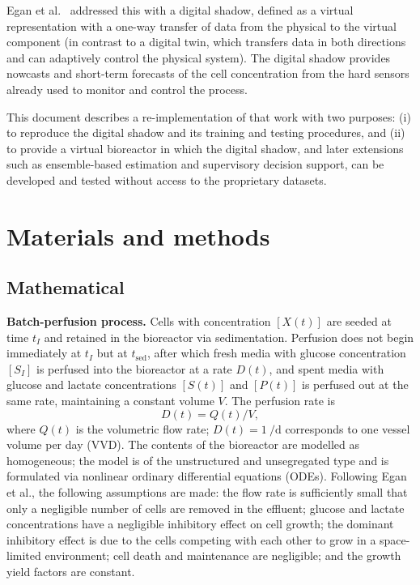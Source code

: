 \documentclass[11pt,a4paper]{article}
\newcommand{\tsed}{t_{\mathrm{sed}}}
\newcommand{\cS}{[S(t)]}
\newcommand{\cP}{[P(t)]}
\newcommand{\cX}{[X(t)]}
\begin{document}
Egan et al.\ \cite{egan2025} addressed this with a digital shadow, defined as a virtual
representation with a one-way transfer of data from the physical to the virtual component (in
contrast to a digital twin, which transfers data in both directions and can adaptively control the
physical system). The digital shadow provides nowcasts and short-term forecasts of the cell
concentration from the hard sensors already used to monitor and control the process.

This document describes a re-implementation of that work with two purposes: (i) to reproduce the
digital shadow and its training and testing procedures, and (ii) to provide a virtual bioreactor in
which the digital shadow, and later extensions such as ensemble-based estimation and supervisory
decision support, can be developed and tested without access to the proprietary datasets.

\section{Materials and methods}

\subsection{Mathematical}

\textbf{Batch-perfusion process.} Cells with concentration $\cX$ are seeded at time $t_I$ and retained
in the bioreactor via sedimentation. Perfusion does not begin immediately at $t_I$ but at $\tsed$,
after which fresh media with glucose concentration $[S_I]$ is perfused into the bioreactor at a
rate $D(t)$, and spent media with glucose and lactate concentrations $\cS$ and $\cP$ is perfused out
at the same rate, maintaining a constant volume $V$. The perfusion rate is
\begin{equation}
  D(t) = Q(t)/V, \label{eq:D}
\end{equation}
where $Q(t)$ is the volumetric flow rate; $D(t)=\SI{1}{\per\day}$ corresponds to one vessel volume
per day (VVD). The contents of the bioreactor are modelled as homogeneous; the model is of the
unstructured and unsegregated type and is formulated via nonlinear ordinary differential equations
(ODEs). Following Egan et al., the following assumptions are made: the flow rate is sufficiently
small that only a negligible number of cells are removed in the effluent; glucose and lactate
concentrations have a negligible inhibitory effect on cell growth; the dominant inhibitory effect is
due to the cells competing with each other to grow in a space-limited environment; cell death and
maintenance are negligible; and the growth yield factors are constant.
\end{document}
